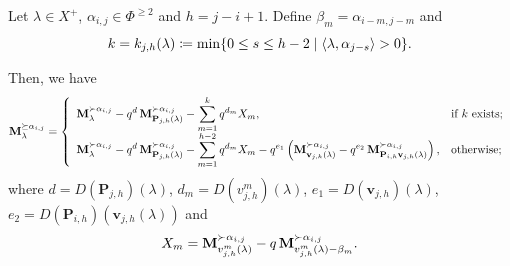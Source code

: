 \begin{proposition}\label{prop: second version refinado}
Let $\lambda\in X^{+}$, $\alpha_{i,j}\in \Phi^{\geq 2}$ and $h=j-i+1$.  
Define $\beta_m=\alpha_{i-m,j-m}$ and 
\begin{equation}
    k=k_{j,h}(\lambda) \coloneq \min\{ 0 \leq s \leq h-2 \mid \langle \lambda , \alpha_{j-s} \rangle>0\} .
\end{equation}

Then, we have
\begin{equation}\label{eq: SID ecuacion combi}
 \mathbf{M}_{\lambda}^{\succeq \alpha_{i,j}} = \left\{ \begin{array}{ll}
 \displaystyle    \mathbf{M}_{\lambda}^{\succ \alpha_{i,j}}
     - q^{d}\,\mathbf{M}_{\mathbf{P}_{j,h}(\lambda)}^{\succ \alpha_{i,j}}
     - \sum_{m=1}^{k}   q^{d_m} X_m , 
       & \mbox{if } k \mbox{ exists;}  \\
 \displaystyle   \mathbf{M}_{\lambda}^{\succ \alpha_{i,j}}
     - q^{d}\,\mathbf{M}_{\mathbf{P}_{j,h}(\lambda)}^{\succ \alpha_{i,j}}
     - \sum_{m=1}^{h-2}   q^{d_m} X_m
     - q^{e_1} \left(
        \mathbf{M}_{\mathbf{v}_{j,h}(\lambda)}^{\succ \alpha_{i,j}}
          - q^{e_2}\,  \mathbf{M}_{\mathbf{P}_{i,h}\mathbf{v}_{j,h}(\lambda)}^{\succ \alpha_{i,j}}
       \right) ,    & \mbox{otherwise;}
  \end{array}   \right.  
\end{equation}
where 
$d = D(\mathbf{P}_{j,h})(\lambda)$, 
$d_m = D(v_{j,h}^m)(\lambda)$, 
$e_1 = D(\mathbf{v}_{j,h})(\lambda)$, $ e_2 = D(\mathbf{P}_{i,h})(\mathbf{v}_{j,h}(\lambda))$ and 
\begin{equation} \label{eq: defi X in SID}
  X_m  =  \mathbf{M}_{v^{m}_{j,h}(\lambda)}^{\succ \alpha_{i,j}}
         -   q\,\mathbf{M}_{v^{m}_{j,h}(\lambda)-\beta_m}^{\succ \alpha_{i,j}}.   
\end{equation}
\end{proposition}




